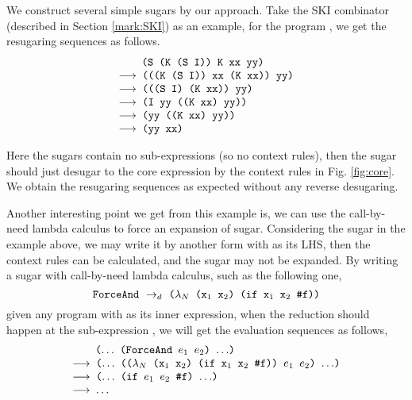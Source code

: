 We construct several simple sugars by our approach. Take the SKI combinator (described in Section \ref{mark:SKI}) as an example, for the program , we get the resugaring sequences as follows.
\[
	\begin{array}{l}
		\quad\;\;\Code{ (S (K (S I)) K xx yy)}\\
	\OneStep{ \Code{ (((K (S I)) xx (K xx)) yy)}}\\
	\OneStep{ \Code{ (((S I) (K xx)) yy)}}\\
	\OneStep{ \Code{ (I yy ((K xx) yy))}}\\
	\OneStep{ \Code{ (yy ((K xx) yy))}}\\
	\OneStep{ \Code{ (yy xx)}}\\
	\end{array}
\]




Here the sugars contain no sub-expressions (so no context rules), then the sugar should just desugar to the core expression by the context rules in Fig. \ref{fig:core}. 
We obtain the resugaring sequences as expected without any reverse desugaring.

Another interesting point we get from this example is, we can use the call-by-need lambda calculus to force an expansion of sugar. Considering the sugar  in the example above, we may write it by another form with  as its LHS, then the context rules can be calculated, and the sugar may not be expanded. By writing a sugar with call-by-need lambda calculus, such as the following one,
\[
\texttt{ForceAnd} ~\rightarrow_d~ \texttt{($\lambda_N$ ($\mbox{\tt x}_1$ $\mbox{\tt x}_2$) (if $\mbox{\tt x}_1$ $\mbox{\tt x}_2$ \#f))}
\]
given any program with  as its inner expression, when the reduction should happen at the sub-expression , we will get the evaluation sequences as follows,
\[
	\begin{array}{l}
		\quad\;\;\Code{ ($\ldots$ (ForceAnd $e_1$ $e_2$) $\ldots$)}\\
	\OneStep{ \Code{ ($\ldots$ (($\lambda_N$ ($\m{x}_1$ $\m{x}_2$) (if $\m{x}_1$ $\m{x}_2$ \false)) $e_1$ $e_2$) $\ldots$)}}\\
	\OneStep{ \Code{ ($\ldots$ (if $e_1$ $e_2$ \false) $\ldots$)}}\\
	\OneStep{ \Code{ $\ldots$}}\\
	\end{array}
\]
